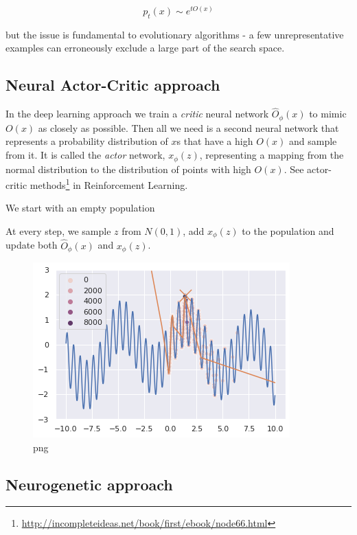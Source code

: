 \begin{equation}
p_t(x) \sim e^{tO(x)}
\end{equation}

but the issue is fundamental to evolutionary algorithms - a few unrepresentative examples can erroneously exclude a large part of the search space.

\subsection{Neural Actor-Critic approach}

In the deep learning approach we train a \emph{critic} neural network $ \hat{O}_{\phi}(x) $ to mimic $ O(x) $ as closely as possible. Then all we need is a second neural network that represents a probability distribution of $ x $s that have a high $ O(x) $ and sample from it. It is called the \emph{actor} network, $ x_{\phi}(z) $, representing a mapping from the normal distribution to the distribution of points with high $ O(x) $. See actor-critic methods\footnote{\url{http://incompleteideas.net/book/first/ebook/node66.html}} in Reinforcement Learning.

We start with an empty population

At every step, we sample $ z $ from $ N(0,1) $, add $ x_{\phi}(z) $ to the population and update both $ \hat{O}_{\phi}(x) $ and $ x_{\phi}(z) $.


    
\begin{figure}
    \centering
    \includegraphics[width=0.8\linewidth]{images/neuropt3.png}
    \caption{png}
\end{figure}

    


\subsection{Neurogenetic approach}

